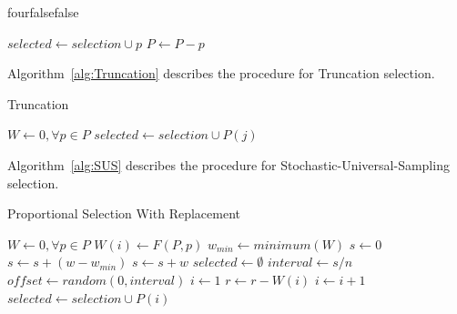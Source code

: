 \documentclass[times,12pt,titlepage]{mstogs}
\begin{document}
\begin{ThesisAppendix}{four}{false}{false}
\begin{algorithm}
\begin{algorithmic}[1]
			\EndIf			
		\EndFor
		\State $selected \leftarrow selection \cup p$
		\State $P \leftarrow P - p$
	\EndFor
\EndProcedure
\end{algorithmic}
\end{algorithm}

Algorithm~\ref{alg:Truncation} describes the procedure for Truncation selection.

\begin{algorithm}
\caption{Truncation}
\label{alg:Truncation}
\begin{algorithmic}[1]
 \label{proc:Truncation}
	\State $W \leftarrow 0,\forall p \in P$
	\EndFor
		\State $selected \leftarrow selection \cup P(j)$
	\EndFor
\EndProcedure
\end{algorithmic}
\end{algorithm}

Algorithm~\ref{alg:SUS} describes the procedure for Stochastic-Universal-Sampling selection.

\begin{algorithm}
\caption{Proportional Selection With Replacement}
\label{alg:SUS}
\begin{algorithmic}[1]
 \label{proc:SUS}
	\State $W \leftarrow 0,\forall p \in P$
		\State $W(i) \leftarrow F(P,p)$
	\EndFor
	\State $w_{min} \leftarrow minimum(W)$	
	\State $s \leftarrow 0$
			\State $s \leftarrow s + (w - w_{min} )$			
		\Else
			\State $s \leftarrow s + w$		
		\EndIf	
	\EndFor
	\State $selected \leftarrow \emptyset$
	\State $interval \leftarrow s / n$
	\State $offset \leftarrow random(0,interval)$
		\State $i \leftarrow 1$
			\State $r \leftarrow r - W(i)$
			\State $i \leftarrow i + 1$
		\EndWhile	
		\State $selected \leftarrow selection \cup P(i)$	
	\EndFor
\EndProcedure
\end{algorithmic}
\end{algorithm}

\label{apx:iRaceBasicEACOCOParams}


\end{ThesisAppendix}
\end{document}
